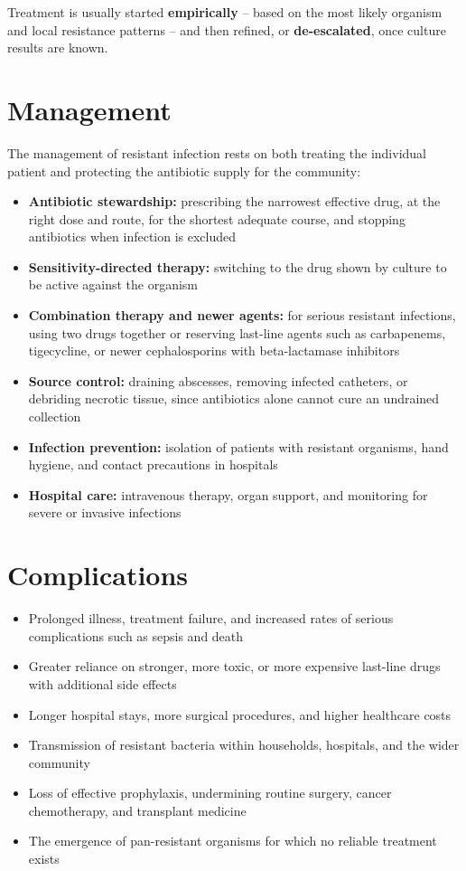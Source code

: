 Treatment is usually started \textbf{empirically} -- based on the most likely organism and local resistance patterns -- and then refined, or \textbf{de-escalated}, once culture results are known.

\section*{Management}
The management of resistant infection rests on both treating the individual patient and protecting the antibiotic supply for the community:

\begin{itemize}
    \item \textbf{Antibiotic stewardship:} prescribing the narrowest effective drug, at the right dose and route, for the shortest adequate course, and stopping antibiotics when infection is excluded
    \item \textbf{Sensitivity-directed therapy:} switching to the drug shown by culture to be active against the organism
    \item \textbf{Combination therapy and newer agents:} for serious resistant infections, using two drugs together or reserving last-line agents such as carbapenems, tigecycline, or newer cephalosporins with beta-lactamase inhibitors
    \item \textbf{Source control:} draining abscesses, removing infected catheters, or debriding necrotic tissue, since antibiotics alone cannot cure an undrained collection
    \item \textbf{Infection prevention:} isolation of patients with resistant organisms, hand hygiene, and contact precautions in hospitals
    \item \textbf{Hospital care:} intravenous therapy, organ support, and monitoring for severe or invasive infections
\end{itemize}

\section*{Complications}
\begin{itemize}
    \item Prolonged illness, treatment failure, and increased rates of serious complications such as sepsis and death
    \item Greater reliance on stronger, more toxic, or more expensive last-line drugs with additional side effects
    \item Longer hospital stays, more surgical procedures, and higher healthcare costs
    \item Transmission of resistant bacteria within households, hospitals, and the wider community
    \item Loss of effective prophylaxis, undermining routine surgery, cancer chemotherapy, and transplant medicine
    \item The emergence of pan-resistant organisms for which no reliable treatment exists
\end{itemize}

